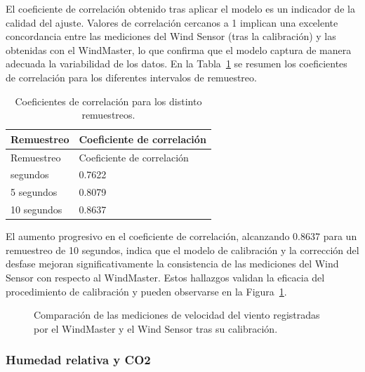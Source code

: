 \documentclass[
  letterpaper,
]{scrbook}
\begin{document}
El coeficiente de correlación obtenido tras aplicar el modelo es un
indicador de la calidad del ajuste. Valores de correlación cercanos a 1
implican una excelente concordancia entre las mediciones del Wind Sensor
(tras la calibración) y las obtenidas con el WindMaster, lo que confirma
que el modelo captura de manera adecuada la variabilidad de los datos.
En la Tabla~\ref{tbl-corr-viento} se resumen los coeficientes de
correlación para los diferentes intervalos de remuestreo.

\begin{longtable}[]{@{}ll@{}}
\caption{Coeficientes de correlación para los distinto
remuestreos.}\label{tbl-corr-viento}\tabularnewline
\toprule\noalign{}
Remuestreo & Coeficiente de correlación \\
\midrule\noalign{}
\endfirsthead
\toprule\noalign{}
Remuestreo & Coeficiente de correlación \\
\midrule\noalign{}
\endhead
\bottomrule\noalign{}
\endlastfoot
3 segundos & 0.7622 \\
5 segundos & 0.8079 \\
10 segundos & 0.8637 \\
\end{longtable}

El aumento progresivo en el coeficiente de correlación, alcanzando
0.8637 para un remuestreo de 10 segundos, indica que el modelo de
calibración y la corrección del desfase mejoran significativamente la
consistencia de las mediciones del Wind Sensor con respecto al
WindMaster. Estos hallazgos validan la eficacia del procedimiento de
calibración y pueden observarse en la Figura~\ref{fig-cviento}.

\begin{figure}


\caption{\label{fig-cviento}Comparación de las mediciones de velocidad
del viento registradas por el WindMaster y el Wind Sensor tras su
calibración.}

\end{figure}%

\subsubsection{Humedad relativa y CO2}\label{humedad-relativa-y-co2-1}
\end{document}
